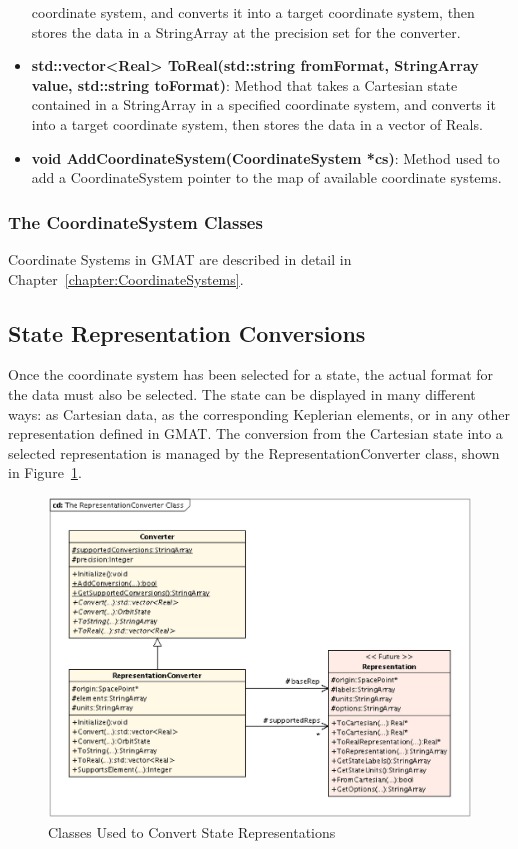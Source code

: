 \begin{itemize}
coordinate system, and converts it into a target coordinate system, then stores the data in a
StringArray at the precision set for the converter.
\item \textbf{std::vector<Real> ToReal(std::string fromFormat, StringArray value, std::string
toFormat)}: Method that takes a Cartesian state contained in a StringArray in a specified
coordinate system, and converts it into a target coordinate system, then stores the data in a
vector of Reals.
\item \textbf{void AddCoordinateSystem(CoordinateSystem *cs)}: Method used to add a CoordinateSystem
pointer to the map of available coordinate systems.
\end{itemize}

\subsubsection{The CoordinateSystem Classes}

Coordinate Systems in GMAT are described in detail in Chapter~\ref{chapter:CoordinateSystems}.

\subsection{State Representation Conversions}

Once the coordinate system has been selected for a state, the actual format for the data must also
be selected.  The state can be displayed in many different ways: as Cartesian data, as the
corresponding Keplerian elements, or in any other representation defined in GMAT.  The conversion
from the Cartesian state into a selected representation is managed by the RepresentationConverter
class, shown in Figure~\ref{figure:RepresentationConverterClasses}.

\begin{figure}[htb]
\begin{center}
\includegraphics[scale=0.5]{Images/TheRepresentationConverterClass.eps}
\caption{\label{figure:RepresentationConverterClasses}Classes Used to Convert State Representations}
\end{center}
\end{figure}

